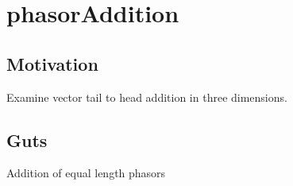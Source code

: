 

\chapter{phasorAddition}
\label{chap:phasorAddition}
{}
\date{Nov 18, 2009}

\beginArtWithToc

\section{Motivation}

Examine vector tail to head addition in three dimensions.

\section{Guts}

Addition of equal length phasors 

\EndNoBibArticle
